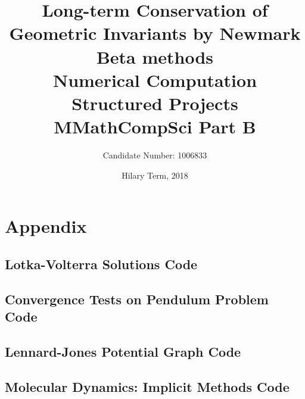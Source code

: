 \documentclass[a4paper, 12pt]{article}
\title{  \vfill
	{Long-term Conservation of Geometric Invariants by Newmark Beta methods}\\
	{\large Numerical Computation Structured Projects}\\
	{\large MMathCompSci Part B}
	\vfill
}
\author{Candidate Number: 1006833}
\date{Hilary Term, 2018}
\numberwithin{equation}{section}
\numberwithin{table}{section}
\numberwithin{figure}{section}
\begin{document}
	\maketitle

	\newpage
	\tableofcontents

	\newpage
	\listoffigures
	\listoftables

	\newpage
 	

	\newpage
 	

	\newpage
	

	\newpage
	

	\newpage
	

	\newpage
	\appendix
	\section{Appendix}
	
	\subsection{ Lotka-Volterra Solutions Code}
	

	\newpage
	\subsection{Convergence Tests on Pendulum Problem Code}
	
	

	\newpage
	\subsection{Lennard-Jones Potential Graph Code}
	

	\newpage
	\subsection{Molecular Dynamics: Implicit Methods Code}
	
	
	
	
	
	
	\BlankLine
	\BlankLine
	

	\newpage
	
	
\end{document}
